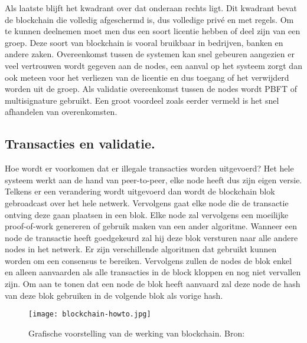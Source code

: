 Als laatste blijft het kwadrant over dat onderaan rechts ligt. Dit kwadrant bevat de blockchain die volledig afgeschermd is, dus volledige privé en met regels. Om te kunnen deelnemen moet men dus een soort licentie hebben of deel zijn van een groep. Deze soort van blockchain is vooral bruikbaar in bedrijven, banken en andere zaken. Overeenkomst tussen de systemen kan snel gebeuren aangezien er veel vertrouwen wordt gegeven aan de nodes, een aanval op het systeem zorgt dan ook meteen voor het verliezen van de licentie en dus toegang of het verwijderd worden uit de groep. Als validatie overeenkomst tussen de nodes wordt PBFT of multisignature gebruikt. Een groot voordeel zoals eerder vermeld is het snel afhandelen van overenkomsten. 
 
 \subsection{Transacties en validatie.}
 Hoe wordt er voorkomen dat er illegale transacties worden uitgevoerd? Het hele systeem werkt aan de hand van peer-to-peer, elke node heeft dus zijn eigen versie. Telkens er een verandering wordt uitgevoerd dan wordt de blockchain blok gebroadcast over het hele netwerk. Vervolgens gaat elke node die de transactie ontving deze gaan plaatsen in een blok. Elke node zal vervolgens een moeilijke proof-of-work genereren of gebruik maken van een ander algoritme. Wanneer een node de transactie heeft goedgekeurd zal hij deze blok versturen naar alle andere nodes in het netwerk. Er zijn verschillende  algoritmen dat gebruikt kunnen worden om een consensus te bereiken. Vervolgens zullen de nodes de blok enkel en alleen aanvaarden als alle transacties in de block kloppen en nog niet vervallen zijn. Om aan te tonen dat een node de blok heeft aanvaard zal deze node de hash van deze blok gebruiken in de volgende blok als vorige hash. 

\begin{figure}
	\texttt{[image: blockchain-howto.jpg]}
	\caption{Grafische voorstelling van de werking van blockchain. Bron: \textcite{pwc.com}}
	\label{fig:blockchain-howto}
\end{figure}

